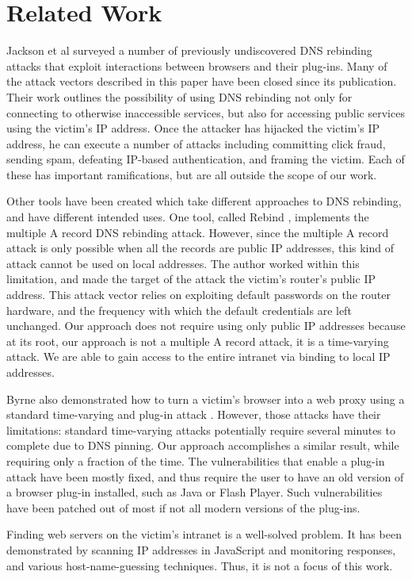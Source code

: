 \section{Related Work}
\label{sec:related}


Jackson et al \cite{protectFromDNS} surveyed a number of previously undiscovered DNS rebinding attacks that exploit interactions between browsers and their plug-ins. Many of the attack vectors described in this paper have been closed since its publication. Their work outlines the possibility of using DNS rebinding not only for connecting to otherwise inaccessible services, but also for accessing public services using the victim's IP address. Once the attacker has hijacked the victim's IP address, he can execute a number of attacks including committing click fraud, sending spam, defeating IP-based authentication, and framing the victim. Each of these has important ramifications, but are all outside the scope of our work.

Other tools have been created which take different approaches to DNS rebinding, and have different intended uses. One tool, called Rebind \cite{rebind}, implements the multiple A record DNS rebinding attack. However, since the multiple A record attack is only possible when all the records are public IP addresses, this kind of attack cannot be used on local addresses. The author worked within this limitation, and made the target of the attack the victim's router's public IP address. This attack vector relies on exploiting default passwords on the router hardware, and the frequency with which the default credentials are left unchanged. Our approach does not require using only public IP addresses because at its root, our approach is not a multiple A record attack, it is a time-varying attack.  We are able to gain access to the entire intranet via binding to local IP addresses.

Byrne also demonstrated how to turn a victim's browser into a web proxy using a standard time-varying and plug-in attack \cite{blackhat}.
However, those attacks have their limitations: standard time-varying attacks potentially require several minutes to complete due to DNS pinning.
Our approach accomplishes a similar result, while requiring only a fraction of the time. 
The vulnerabilities that enable a plug-in attack have been mostly fixed, and thus require the user to have an old version of a browser plug-in installed, such as Java or Flash Player.
Such vulnerabilities have been patched out of most if not all modern versions of the plug-ins.

Finding web servers on the victim's intranet is a well-solved problem. It has been demonstrated by scanning IP addresses in JavaScript and monitoring responses\cite{grossman}, and various host-name-guessing techniques\cite{protectFromDNS}. Thus, it is not a focus of this work.


